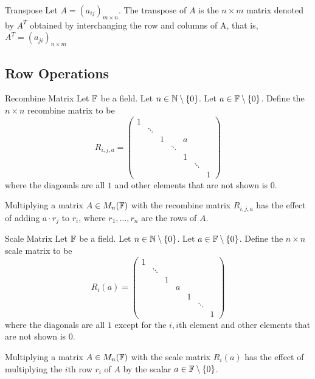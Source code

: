 \documentclass[a4paper]{article}
\begin{document}
\begin{defn}{Transpose}{} Let $A=(a_{ij})_{m\times n}$.  The transpose of $A$ is the $n\times m$ matrix denoted by $A^T$ obtained by interchanging the row and columns of A, that is, $A^T=(a_{ji})_{n\times m}$
\end{defn}

\subsection{Row Operations}
\begin{defn}{Recombine Matrix}{} Let $\mathbb{F}$ be a field. Let $n\in\mathbb{N}\setminus\{0\}$. Let $a\in\mathbb{F}\setminus\{0\}$. Define the $n\times n$ recombine matrix to be $$R_{i,j,a}=
\begin{pmatrix}
1&&&&&&\\
&\ddots&&&&&\\
&&1&&a&&\\
&&&\ddots&&&\\
&&&&1&&\\
&&&&&\ddots&\\
&&&&&&1
\end{pmatrix}$$ where the diagonals are all $1$ and other elements that are not shown is $0$.
\end{defn}

Multiplying a matrix $A\in M_n(\mathbb{F})$ with the recombine matrix $R_{i,j,a}$ has the effect of adding $a\cdot r_j$ to $r_i$, where $r_1,\dots,r_n$ are the rows of $A$. 

\begin{defn}{Scale Matrix}{} Let $\mathbb{F}$ be a field. Let $n\in\mathbb{N}\setminus\{0\}$. Let $a\in\mathbb{F}\setminus\{0\}$. Define the $n\times n$ scale matrix to be $$R_{i}(a)=
\begin{pmatrix}
1&&&&&&\\
&\ddots&&&&&\\
&&1&&&&\\
&&&a&&&\\
&&&&1&&\\
&&&&&\ddots&\\
&&&&&&1
\end{pmatrix}$$ where the diagonals are all $1$ except for the $i,i$th element and other elements that are not shown is $0$.
\end{defn}

Multiplying a matrix $A\in M_n(\mathbb{F})$ with the scale matrix $R_i(a)$ has the effect of multiplying the $i$th row $r_i$ of $A$ by the scalar $a\in\mathbb{F}\setminus\{0\}$. 
\end{document}

